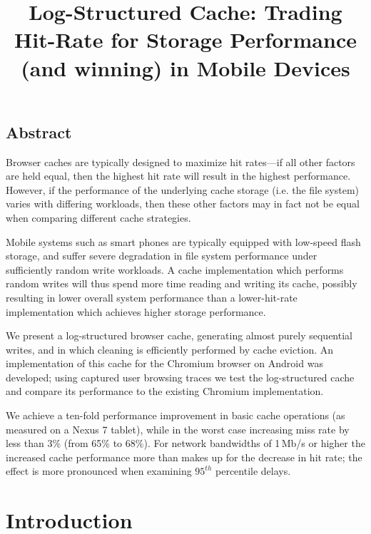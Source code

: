 \documentclass[letterpaper,twocolumn,10pt]{article}
\begin{document}
\title{\Large \bf Log-Structured Cache: Trading Hit-Rate for Storage Performance
  (and winning) in Mobile Devices}

\date{}
\maketitle

\thispagestyle{empty}

\subsection*{Abstract}
Browser caches are typically designed to maximize hit rates---if all other
factors are held equal, then the highest hit rate will result in the highest
performance. However, if the performance of the underlying cache storage
(i.e. the file system) varies with differing workloads, then these other factors
may in fact not be equal when comparing different cache strategies.

Mobile systems such as smart phones are typically equipped with low-speed flash
storage, and suffer severe degradation in file system performance under
sufficiently random write workloads. A cache implementation which performs
random writes will thus spend more time reading and writing its cache, possibly
resulting in lower overall system performance than a lower-hit-rate
implementation which achieves higher storage performance.

We present a log-structured browser cache, generating almost purely sequential
writes, and in which cleaning is efficiently performed by cache eviction. An
implementation of this cache for the Chromium browser on Android was developed;
using captured user browsing traces we test the log-structured cache and compare
its performance to the existing Chromium implementation.

We achieve a ten-fold performance improvement in basic cache operations (as
measured on a Nexus 7 tablet), while in the worst case increasing miss rate by
less than 3\% (from 65\% to 68\%). For network bandwidths of 1\,Mb/s or higher
the increased cache performance more than makes up for the decrease in hit rate;
the effect is more pronounced when examining $95^{th}$ percentile delays.

\section{Introduction}
\end{document}
